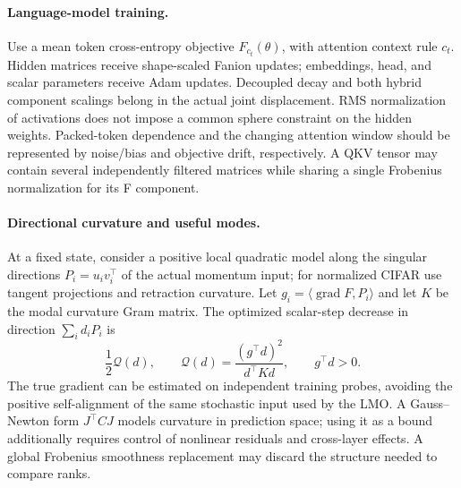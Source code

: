 \paragraph{Language-model training.}
Use a mean token cross-entropy objective $F_{c_t}(\theta)$, with attention
context rule $c_t$. Hidden matrices receive shape-scaled Fanion updates;
embeddings, head, and scalar parameters receive Adam updates. Decoupled
decay and both hybrid component scalings belong in the actual joint
displacement. RMS normalization of activations does not impose a common
sphere constraint on the hidden weights. Packed-token dependence and the
changing attention window should be represented by noise/bias and objective
drift, respectively. A QKV tensor may contain several independently filtered
matrices while sharing a single Frobenius normalization for its F component.

\paragraph{Directional curvature and useful modes.}
At a fixed state, consider a positive local quadratic model along the
singular directions $P_i=u_iv_i^\top$ of the actual momentum input; for
normalized CIFAR use tangent projections and retraction curvature. Let
$g_i=\langle\operatorname{grad}F,P_i\rangle$ and let $K$ be the modal
curvature Gram matrix. The optimized scalar-step decrease in direction
$\sum_i d_iP_i$ is
\begin{equation}\label{tadl:quality}
 \frac12\mathcal Q(d),\qquad
 \mathcal Q(d)=\frac{(g^\top d)^2}{d^\top Kd},\qquad g^\top d>0.
\end{equation}
The true gradient can be estimated on independent training probes, avoiding
the positive self-alignment of the same stochastic input used by the LMO.
A Gauss--Newton form $J^\top C J$ models curvature in prediction space;
using it as a bound additionally requires control of nonlinear residuals
and cross-layer effects. A global Frobenius smoothness replacement may
discard the structure needed to compare ranks.

